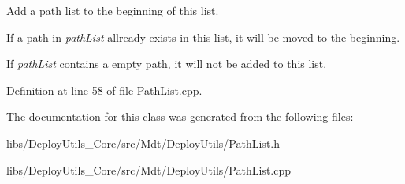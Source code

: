 Add a path list to the beginning of this list. 

If a path in {\itshape path\+List} allready exists in this list, it will be moved to the beginning.

If {\itshape path\+List} contains a empty path, it will not be added to this list. 

Definition at line 58 of file Path\+List.\+cpp.



The documentation for this class was generated from the following files\+:\begin{DoxyCompactItemize}
\item 
libs/\+Deploy\+Utils\+\_\+\+Core/src/\+Mdt/\+Deploy\+Utils/Path\+List.\+h\item 
libs/\+Deploy\+Utils\+\_\+\+Core/src/\+Mdt/\+Deploy\+Utils/Path\+List.\+cpp\end{DoxyCompactItemize}
